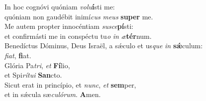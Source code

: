 \evenverse In hoc cognóvi quóniam \textit{vo}\textit{lu}\textbf{í}sti me:~\*\\
\evenverse quóniam non gaudébit inimí\textit{cus} \textit{me}\textit{us} \textbf{su}\textbf{per} me.\\
\oddverse Me autem propter innocéntiam \textit{su}\textit{sce}\textbf{pí}sti:~\*\\
\oddverse et confirmásti me in conspéctu tu\textit{o} \textit{in} \textit{æ}\textbf{tér}num.\\
\evenverse Benedíctus Dóminus, Deus Israël, a sǽculo et us\textit{que} \textit{in} \textbf{sǽ}culum:~\*\\
\evenverse \textit{fi}\textit{at}, \textbf{fi}at.\\
\oddverse Glória Pa\textit{tri}, \textit{et} \textbf{Fí}lio,~\*\\
\oddverse et Spi\textit{rí}\textit{tu}\textit{i} \textbf{San}cto.\\
\evenverse Sicut erat in princípio, et \textit{nunc}, \textit{et} \textbf{sem}per,~\*\\
\evenverse et in sǽcula sæ\textit{cu}\textit{ló}\textit{rum}. \textbf{A}men.\\
